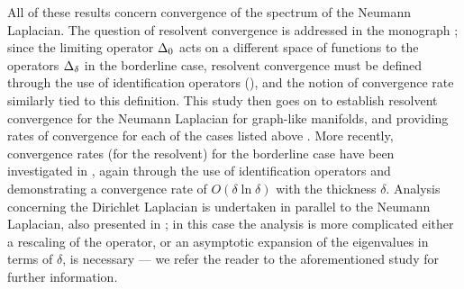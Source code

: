 All of these results concern convergence of the spectrum of the Neumann Laplacian.
The question of resolvent convergence is addressed in the monograph \cite{post2012spectral}; since the limiting operator $\Delta_0$ acts on a different space of functions to the operators $\Delta_{\delta}$ in the borderline case, resolvent convergence must be defined through the use of identification operators (\cite[section 4]{post2012spectral}), and the notion of convergence rate similarly tied to this definition.
This study then goes on to establish resolvent convergence for the Neumann Laplacian for graph-like manifolds, and providing rates of convergence for each of the cases listed above \cite[theorem 1.3.2]{post2012spectral}.
More recently, convergence rates (for the resolvent) for the borderline case have been investigated in \cite{cherednichenko2022norm}, again through the use of identification operators and demonstrating a convergence rate of $O(\delta\ln\delta)$ with the thickness $\delta$.
Analysis concerning the Dirichlet Laplacian is undertaken in parallel to the Neumann Laplacian, also presented in \cite{post2012spectral}; in this case the analysis is more complicated either a rescaling of the operator, or an asymptotic expansion of the eigenvalues in terms of $\delta$, is necessary --- we refer the reader to the aforementioned study for further information.

